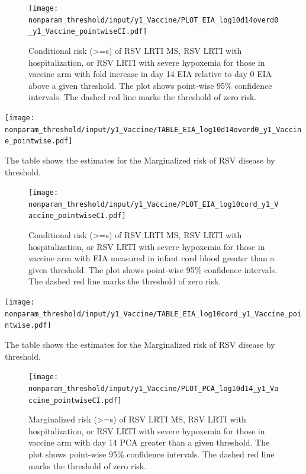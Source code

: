 \documentclass[11pt]{article}
\begin{document}
\begin{figure}[H]
    \centering
    \texttt{[image: nonparam\_threshold/input/y1\_Vaccine/PLOT\_EIA\_log10d14overd0\_y1\_Vaccine\_pointwiseCI.pdf]}
    \caption{Conditional risk (>=s) of RSV LRTI MS, RSV LRTI with hospitalization, or RSV LRTI with severe hypoxemia for those in vaccine arm with fold increase in day 14 EIA relative to day 0 EIA above a given threshold. The plot shows point-wise 95\% confidence intervals. The dashed red line marks the threshold of zero risk.}
\end{figure}

\begin{table}[H]
    \centering
    \texttt{[image: nonparam\_threshold/input/y1\_Vaccine/TABLE\_EIA\_log10d14overd0\_y1\_Vaccine\_pointwise.pdf]}
    \caption{The table shows the  estimates for the Marginalized risk of RSV disease by threshold. }
\end{table}

\begin{figure}[H]
    \centering
    \texttt{[image: nonparam\_threshold/input/y1\_Vaccine/PLOT\_EIA\_log10cord\_y1\_Vaccine\_pointwiseCI.pdf]}
   \caption{Conditional risk (>=s) of RSV LRTI MS, RSV LRTI with hospitalization, or RSV LRTI with severe hypoxemia for those in vaccine arm with EIA measured in infant cord blood greater than a given threshold. The plot shows point-wise 95\% confidence intervals. The dashed red line marks the threshold of zero risk.}
\end{figure}

\begin{table}[H]
    \centering
    \texttt{[image: nonparam\_threshold/input/y1\_Vaccine/TABLE\_EIA\_log10cord\_y1\_Vaccine\_pointwise.pdf]}
    \caption{The table shows the  estimates for the Marginalized risk of RSV disease by threshold. }
\end{table}

\begin{figure}[H]
    \centering
    \texttt{[image: nonparam\_threshold/input/y1\_Vaccine/PLOT\_PCA\_log10d14\_y1\_Vaccine\_pointwiseCI.pdf]}
   \caption{Marginalized risk (>=s) of RSV LRTI MS, RSV LRTI with hospitalization, or RSV LRTI with severe hypoxemia for those in vaccine arm with day 14 PCA greater than a given threshold. The plot shows point-wise 95\% confidence intervals. The dashed red line marks the threshold of zero risk.}
      \label{tab:PLOT_PCA_log10d14_y1_Vaccine_pointwiseCI.pdf}

\end{figure}
\end{document}
